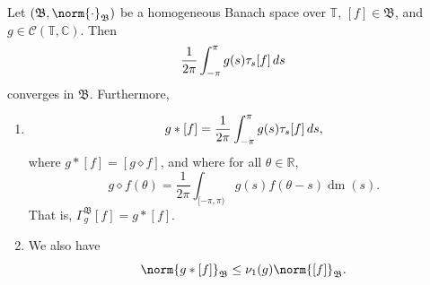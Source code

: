 \documentclass[notoc,notitlepage]{tufte-book}
\DeclareMathOperator{\dm}{dm}
\begin{document}
\begin{thm}\label{thm:riemannian_version_of_convolution_on_homogeneous_banach_spaces}
  Let $(\mathfrak{B}, \norm{\cdot}_{\mathfrak{B}})$ be a homogeneous
  Banach space over $\mathbb{T}$, $[f] \in \mathfrak{B}$,
  and $g \in \mathcal{C}(\mathbb{T}, \mathbb{C})$.
  Then
  \begin{equation*}
    \frac{1}{2\pi} \int_{-\pi}^{\pi} g(s) \tau_s[f] \mathop{}\!d{s}
  \end{equation*}
  converges in $\mathfrak{B}$. Furthermore,
  \begin{enumerate}
    \item 
      \begin{equation*}
        g * [f] = \frac{1}{2\pi} \int_{-\pi}^{\pi} g(s) \tau_s[f] \mathop{}\!d{s},
      \end{equation*}
      where $g * [f] = [g \diamond f]$, and where for all $\theta \in \mathbb{R}$,
      \begin{equation*}
        g \diamond f(\theta)
        = \frac{1}{2\pi} \int_{[-\pi, \pi)} g(s) f(\theta - s) \dm(s).
      \end{equation*}
      That is, $\Gamma_g^{\mathfrak{B}}[f] = g * [f]$.

    \item We also have
      \begin{equation*}
        \norm{g * [f]}_{\mathfrak{B}} \leq \nu_1(g) \norm{[f]}_{\mathfrak{B}}.
      \end{equation*}
  \end{enumerate}
\end{thm}
\end{document}
